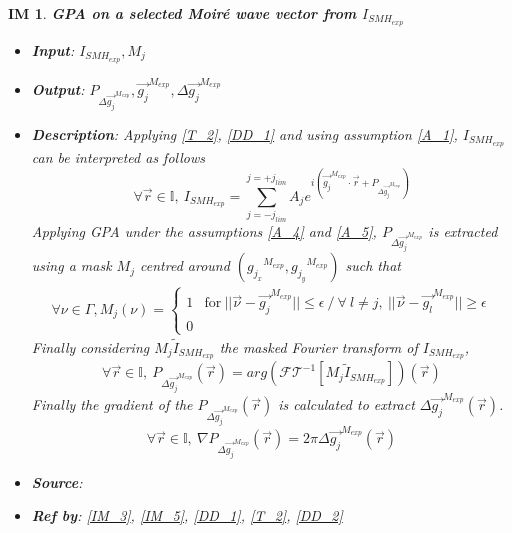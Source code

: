\documentclass[12pt]{article}
\newtheorem{IM}{IM}
\begin{document}
\begin{IM}
\label{IM_2}
\noindent\colorbox{shadecolorIM}{\normalfont \textbf{GPA on a selected Moir{\'e} wave vector from $I_{SMH_{exp}}$}}
\normalfont
\begin{itemize}
\item \textbf{Input}: $I_{SMH_{exp}}, M_j$
\item \textbf{Output}: $P_{\Delta \overrightarrow{g_{j}}^{M_{exp}}}, \overrightarrow{g_{j}}^{M_{exp}}, \Delta \overrightarrow{g_{j}}^{M_{exp}}$
\item \textbf{Description}: Applying \cref{T_2}, \cref{DD_1} and using assumption \cref{A_1}, $I_{SMH_{exp}}$ can be interpreted as follows
\begin{equation}
\forall \vec{r} \in \mathbb{I},\ I_{SMH_{exp}}=\sum_{j=-j_{lim}}^{j=+j_{lim}}A_je^{i(\overrightarrow{g_{j}}^{M_{exp}}\cdot\vec{r}+P_{\Delta \overrightarrow{g_{j}}^{M_{exp}}})}
\end{equation}
Applying GPA under the assumptions \cref{A_4} and \cref{A_5}, $P_{\Delta \overrightarrow{g_{j}}^{M_{exp}}}$ is extracted using a mask $M_j$ centred around $({g_{j_x}}^{M_{exp}},{g_{j_y}}^{M_{exp}})$ such that
\begin{equation}
\begin{gathered}
\forall \nu \in \Gamma, M_j(\nu) = 
\begin{cases}
1 & \text{for} \ ||\vec{\nu}-\overrightarrow{g_{j}}^{M_{exp}}||\leq\epsilon \ / \ \forall \ l\neq j, \ ||\vec{\nu}-\overrightarrow{g_{l}}^{M_{exp}}||\geq \epsilon \\
0
\end{cases}
\end{gathered}
\end{equation}
Finally considering $M_j\widetilde{I}_{SMH_{exp}}$ the masked Fourier transform of $I_{SMH_{exp}}$,
\begin{equation}
\forall \vec{r} \in \mathbb{I},\ P_{\Delta \overrightarrow{g_{j}}^{M_{exp}}}(\vec{r})=arg(\mathcal{FT}^{-1}[M_j\widetilde{I}_{SMH_{exp}}])(\vec{r})
\end{equation}
Finally the gradient of the $P_{\Delta \overrightarrow{g_{j}}^{M_{exp}}}(\vec{r})$ is calculated to extract ${\Delta \overrightarrow{g_{j}}^{M_{exp}}}(\vec{r})$.
\begin{equation}
\forall \vec{r} \in \mathbb{I},\ \nabla P_{\Delta \overrightarrow{g_{j}}^{M_{exp}}}(\vec{r})=2\pi\Delta \overrightarrow{g_{j}}^{M_{exp}}(\vec{r})
\end{equation}
\item \textbf{Source}: \cite{Hytch1998}
\item \textbf{Ref by}: \cref{IM_3}, \cref{IM_5}, \cref{DD_1}, \cref{T_2}, \cref{DD_2}
\end{itemize}
\end{IM}
\end{document}
